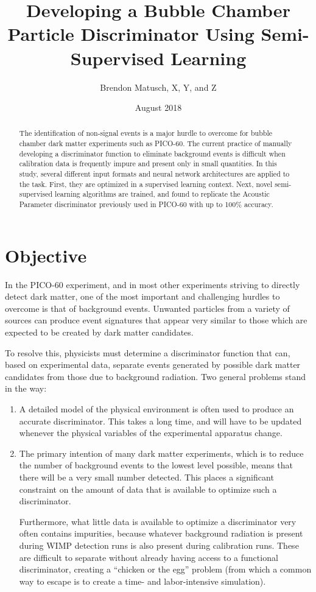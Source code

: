 \documentclass[10pt]{article}
\begin{document}
\title{Developing a Bubble Chamber Particle Discriminator Using Semi-Supervised Learning}
\author{Brendon Matusch, X, Y, and Z}
\date{August 2018}
\maketitle

\begin{abstract}
    The identification of non-signal events is a major hurdle to overcome for bubble chamber dark matter experiments such as PICO-60. The current practice of manually developing a discriminator function to eliminate background events is difficult when calibration data is frequently impure and present only in small quantities. In this study, several different input formats and neural network architectures are applied to the task. First, they are optimized in a supervised learning context. Next, novel semi-supervised learning algorithms are trained, and found to replicate the Acoustic Parameter discriminator previously used in PICO-60 with up to 100\% accuracy.
\end{abstract}

\section{Objective}

In the PICO-60 experiment, and in most other experiments striving to directly detect dark matter, one of the most important and challenging hurdles to overcome is that of background events. Unwanted particles from a variety of sources can produce event signatures that appear very similar to those which are expected to be created by dark matter candidates.

To resolve this, physicists must determine a discriminator function that can, based on experimental data, separate events generated by possible dark matter candidates from those due to background radiation. Two general problems stand in the way:

\begin{enumerate}
    \item A detailed model of the physical environment is often used to produce an accurate discriminator. This takes a long time, and will have to be updated whenever the physical variables of the experimental apparatus change.

    \item The primary intention of many dark matter experiments, which is to reduce the number of background events to the lowest level possible, means that there will be a very small number detected. This places a significant constraint on the amount of data that is available to optimize such a discriminator.

    Furthermore, what little data is available to optimize a discriminator very often contains impurities, because whatever background radiation is present during WIMP detection runs is also present during calibration runs. These are difficult to separate without already having access to a functional discriminator, creating a ``chicken or the egg'' problem (from which a common way to escape is to create a time- and labor-intensive simulation).
\end{enumerate}
\end{document}
